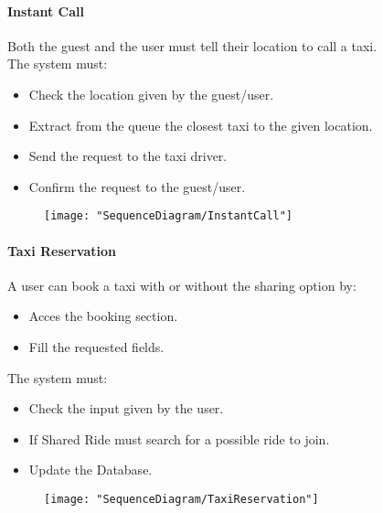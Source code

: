 		\paragraph{Instant Call}
			Both the guest and the user must tell their location to call a taxi.\\
			The system must:\begin{itemize}
				\item Check the location given by the guest/user.
				\item Extract from the queue the closest taxi to the given location.
				\item Send the request to the taxi driver.
				\item Confirm the request to the guest/user.
			\end{itemize}
			\begin{figure}[h!]
				\centering
				\texttt{[image: "SequenceDiagram/InstantCall"]}
			\end{figure}
			\newpage

		\paragraph{Taxi Reservation}
			A user can book a taxi with or without the sharing option by:\begin{itemize}
				\item Acces the booking {section}.
				\item Fill the requested fields.
			\end{itemize}
			The system must:\begin{itemize}
				\item Check the input given by the user.
				\item If Shared Ride must search for a possible ride to join\askpippo.
				\item Update the Database.
			\end{itemize}

			\begin{figure}[h!]
				\centering
				\texttt{[image: "SequenceDiagram/TaxiReservation"]}
			\end{figure}
			\newpage

